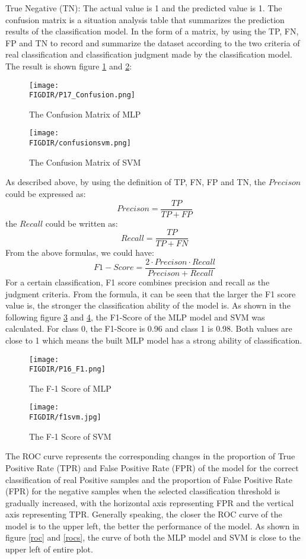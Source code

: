 True Negative (TN): The actual value is 1 and the predicted value is 1.
The confusion matrix is a situation analysis table that summarizes the prediction results of the classification model. In the form of a matrix, by using the TP, FN, FP and TN to record and summarize the dataset according to the two criteria of real classification and classification judgment made by the classification model. The result is shown figure \ref{confusion matrix} and \ref{confusion matrix of SVM}:

\begin{figure}[ht]
\centering
\texttt{[image: \\FIGDIR/P17\_Confusion.png]}
\caption{The Confusion Matrix of MLP}
\label{confusion matrix}
\end{figure}\begin{figure}[ht]
\centering
\texttt{[image: \\FIGDIR/confusionsvm.png]}
\caption{The Confusion Matrix of SVM}
\label{confusion matrix of SVM}
\end{figure}
As described above, by using the definition of TP, FN, FP and TN, the $Precison$ could be expressed as:
\begin{equation}
    Precison=\frac{TP}{TP+FP}
\end{equation}
the $Recall$ could be written as:
\begin{equation}
    Recall=\frac{TP}{TP+FN}
\end{equation}
From the above formulas, we could have:
\begin{equation}
    F1-Score = \frac{2\cdot Precison \cdot Recall }{Precison + Recall}
\end{equation}
For a certain classification, F1 score combines precision and recall as the judgment criteria. From the formula, it can be seen that the larger the F1 score value is, the stronger the classification ability of the model is. As shown in the following figure \ref{f1} and \ref{f1s}, the F1-Score of the MLP model and SVM was calculated. For class 0, the F1-Score is 0.96 and class 1 is 0.98. Both values are close to 1 which means the built MLP model has a strong ability of classification.

\begin{figure}[ht]
\centering
\texttt{[image: \\FIGDIR/P16\_F1.png]}
\caption{The F-1 Score of MLP}
\label{f1}
\end{figure}
\begin{figure}[ht]
\centering
\texttt{[image: \\FIGDIR/f1svm.jpg]}
\caption{The F-1 Score of SVM}
\label{f1s}
\end{figure}
The ROC curve represents the corresponding changes in the proportion of True Positive Rate (TPR) and False Positive Rate (FPR) of the model for the correct classification of real Positive samples and the proportion of False Positive Rate (FPR) for the negative samples when the selected classification threshold is gradually increased, with the horizontal axis representing FPR and the vertical axis representing TPR. Generally speaking, the closer the ROC curve of the model is to the upper left, the better the performance of the model. As shown in figure \ref{roc} and \ref{rocs}, the curve of both the MLP model and SVM is close to the upper left of entire plot.

